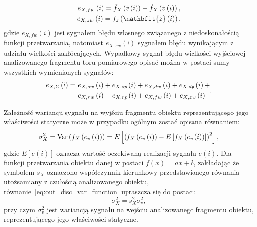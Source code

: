 \begin{gather}
e_{X,fw} \emb{i} = \tilde{f}_{X} \left( \dot{v} \emb{i} \right) - \dot{f}_{X} \left( \dot{v} \emb{i} \right) \label{eq:out_disc_err_funct_self}, \\
e_{X,zw} \emb{i} = f_{z} \emb{\mathbfit{z} \emb{i}} \label{eq:out_disc_err_env_self},
\end{gather}
gdzie $e_{X,fw}(i)$ jest sygnałem błędu własnego związanego z niedoskonałością funkcji przetwarzania, natomiast $e_{X,zw}(i)$ sygnałem błędu wynikającym z udziału wielkości zakłócających. Wypadkowy sygnał błędu wielkości wyjściowej analizowanego fragmentu toru pomiarowego opisać można w postaci sumy wszystkich wymienionych sygnałów:
\begin{equation}
\begin{split}
e_{X,\Sigma} \left(i\right) =~
& e_{X,sw} \left(i\right) + e_{X,sp} \left(i\right) + e_{X,dw} \left(i\right) + e_{X,dp} \left(i\right) + \\
& e_{X,rw} \left(i\right) + e_{X,rp} \left(i\right) + e_{X,fw} \left(i\right) + e_{X,zw} \left(i\right)
\end{split}
\label{eq:out_disc_err_sum_all}.
\end{equation}

Zależność wariancji sygnału na wyjściu fragmentu obiektu reprezentującego jego właściwości statyczne może w przypadku ogólnym zostać opisana równaniem:
\begin{equation}
\sigma_{X}^{2} = \text{Var}\left(f_{X} \left(e_{v} \left(i\right)\right)\right) = E \left[ \left( f_{X} \left(e_{v} \left(i\right)\right) - E \left[ f_{X} \left(e_{v} \left(i\right)\right) \right] \right)^2 \right] \label{eq:out_disc_var_function},
\end{equation}
gdzie $E[e(i)]$ oznacza wartość oczekiwaną realizacji sygnału $e(i)$. Dla funkcji przetwarzania obiektu danej w postaci $f(x) = ax+b$, zakładając że symbolem $s_{X}$ oznaczono współczynnik kierunkowy przedstawionego równania utożsamiany z czułością analizowanego obiektu, równanie~\eqref{eq:out_disc_var_function} upraszcza się do postaci:
\begin{equation}
\sigma_{X}^{2} = s_{X}^{2} \sigma_{v}^{2} \label{eq:out_disc_var_sense},
\end{equation}
przy czym $\sigma_{v}^{2}$ jest wariancją sygnału na wejściu analizowanego fragmentu obiektu, reprezentującego jego właściwości statyczne.

